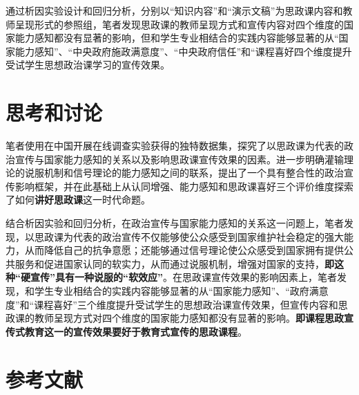 \documentclass[
  12pt,
]{ctexart}
\begin{document}
通过析因实验设计和回归分析，分别以``知识内容''和``演示文稿''为思政课内容和教师呈现形式的参照组，笔者发现思政课的教师呈现方式和宣传内容对四个维度的国家能力感知都没有显著的影响，但和学生专业相结合的实践内容能够显著的从``国家能力感知''、``中央政府施政满意度''、``中央政府信任''和``课程喜好四个维度提升受试学生思想政治课学习的宣传效果。

\hypertarget{ux601dux8003ux548cux8ba8ux8bba}{%
\section{思考和讨论}\label{ux601dux8003ux548cux8ba8ux8bba}}

笔者使用在中国开展在线调查实验获得的独特数据集，探究了以思政课为代表的政治宣传与国家能力感知的关系以及影响思政课宣传效果的因素。进一步明确灌输理论的说服机制和信号理论的能力感知之间的联系，提出了一个具有整合性的政治宣传影响框架，并在此基础上从认同增强、能力感知和思政课喜好三个评价维度探索了如何\textbf{讲好思政课}这一时代命题。

结合析因实验和回归分析，在政治宣传与国家能力感知的关系这一问题上，笔者发现，以思政课为代表的政治宣传不仅能够使公众感受到国家维护社会稳定的强大能力，从而降低自己的抗争意愿；还能够通过信号理论使公众感受到国家拥有提供公共服务和促进国家认同的软实力，从而通过说服机制，增强对国家的支持，\textbf{即这种``硬宣传''具有一种说服的``软效应''}。在思政课宣传效果的影响因素上，笔者发现，和学生专业相结合的实践内容能够显著的从``国家能力感知''、``政府满意度''和``课程喜好''三个维度提升受试学生的思想政治课宣传效果，但宣传内容和思政课的教师呈现方式对四个维度的国家能力感知都没有显著的影响。\textbf{即课程思政宣传式教育这一的宣传效果要好于教育式宣传的思政课程}。

\newpage

\hypertarget{ux53c2ux8003ux6587ux732e}{%
\section*{参考文献}\label{ux53c2ux8003ux6587ux732e}}
\end{document}
